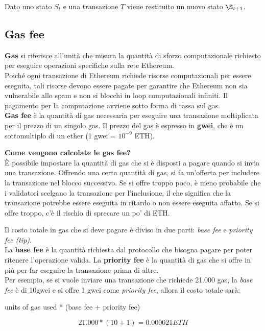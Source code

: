 Dato uno stato $S_t$ e una transazione $T$ viene restituito un nuovo stato
$\S_{t+1}$.

\subsection{Gas fee}
\textbf{Gas} si riferisce all'unità che misura la quantità di sforzo computazionale
richiesto per eseguire operazioni specifiche sulla rete Ethereum. \\
Poiché ogni transazione di Ethereum richiede risorse computazionali per essere
eseguita, tali risorse devono essere pagate per garantire che Ethereum non sia
vulnerabile allo spam e non si blocchi in loop computazionali infiniti. Il
pagamento per la computazione avviene sotto forma di tassa sul gas. \\
\textbf{Gas fee} è la quantità di gas necessaria per eseguire una transazione
moltiplicata per il prezzo di un singolo gas. Il prezzo del gas è espresso in
\textbf{gwei}, che è un sottomultiplo di un ether (1 gwei = $10^{-9}$ ETH).

\textbf{Come vengono calcolate le gas fee?} \\
È possibile impostare la quantità di gas che si è disposti a pagare quando si
invia una transazione. Offrendo una certa quantità di gas, si fa un'offerta per
includere la transazione nel blocco successivo. Se si offre troppo poco, è meno
probabile che i validatori scelgano la transazione per l'inclusione, il che
significa che la transazione potrebbe essere eseguita in ritardo o non essere
eseguita affatto. Se si offre troppo, c'è il rischio di sprecare un po' di ETH.

Il costo totale in gas che si deve pagare è diviso in due parti: 
\textit{base fee} e \textit{priority fee (tip)}. \\
La \textbf{base fee} è la quantità richiesta dal protocollo che bisogna pagare
per poter ritenere l'operazione valida. La \textbf{priority fee} è la quantità
di gas che si offre in più per far eseguire la transazione prima di altre. \\
Per esempio, se si vuole inviare una transazione che richiede 21.000 gas, la
\textit{base fee} è di 10gwei e si offre 1 gwei come \textit{priority fee},
allora il costo totale sarà: 
\begin{center}
units of gas used * (base fee + priority fee)
\end{center}
\begin{equation}
    \label{eq:gasFee}
    21.000 * (10 + 1) = 0.000021 ETH
\end{equation}

